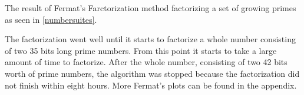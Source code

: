 The result of Fermat's Farctorization method factorizing a set of growing primes as seen in \ref{numbersuites}.



The factorization went well until it starts to factorize a whole number consisting of two 35 bits long prime numbers. From this point it starts to take a large amount of time to factorize. After the whole number, consisting of two 42 bits worth of prime numbers, the algorithm was stopped because the factorization did not finish within eight hours. 
More Fermat's plots can be found in the appendix.